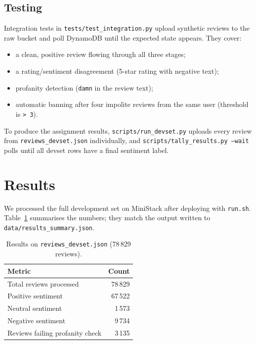 \documentclass[11pt,a4paper]{article}
\begin{document}
\subsection{Testing}

Integration tests in \texttt{tests/test\_integration.py} upload synthetic
reviews to the raw bucket and poll DynamoDB until the expected state
appears. They cover:

\begin{itemize}
    \item a clean, positive review flowing through all three stages;
    \item a rating/sentiment disagreement (5-star rating with negative
          text);
    \item profanity detection (\texttt{damn} in the review text);
    \item automatic banning after four impolite reviews from the same
          user (threshold is \texttt{> 3}).
\end{itemize}

To produce the assignment results, \texttt{scripts/run\_devset.py}
uploads every review from \texttt{reviews\_devset.json} individually,
and \texttt{scripts/tally\_results.py --wait} polls until all devset
rows have a final sentiment label.

\section{Results}

We processed the full development set on MiniStack after deploying with
\texttt{run.sh}. Table~\ref{tab:results} summarises the numbers; they
match the output written to \texttt{data/results\_summary.json}.

\begin{table}[h]
    \centering
    \caption{Results on \texttt{reviews\_devset.json} (78\,829 reviews).}
    \label{tab:results}
    \begin{tabular}{@{}lr@{}}
        \toprule
        Metric & Count \\
        \midrule
        Total reviews processed        & 78\,829 \\
        Positive sentiment           & 67\,522 \\
        Neutral sentiment            &  1\,573 \\
        Negative sentiment           &  9\,734 \\
        Reviews failing profanity check &  3\,135 \\
        \bottomrule
    \end{tabular}
\end{table}
\end{document}
